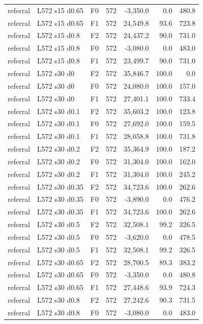 \begin{longtable}{p{1.8cm}p{3.35cm}lrrrr}
referral & L572 s15 d0.65 & F0 & 572 & -3,350.0 & 0.0 & 480.8\\
referral & L572 s15 d0.65 & F1 & 572 & 24,549.8 & 93.6 & 723.8\\
referral & L572 s15 d0.8 & F2 & 572 & 24,437.2 & 90.0 & 731.0\\
referral & L572 s15 d0.8 & F0 & 572 & -3,080.0 & 0.0 & 483.0\\
referral & L572 s15 d0.8 & F1 & 572 & 23,499.7 & 90.0 & 731.0\\
referral & L572 s30 d0 & F2 & 572 & 35,846.7 & 100.0 & 0.0\\
referral & L572 s30 d0 & F0 & 572 & 24,080.0 & 100.0 & 157.0\\
referral & L572 s30 d0 & F1 & 572 & 27,401.1 & 100.0 & 733.4\\
referral & L572 s30 d0.1 & F2 & 572 & 35,603.2 & 100.0 & 123.8\\
referral & L572 s30 d0.1 & F0 & 572 & 27,692.0 & 100.0 & 159.5\\
referral & L572 s30 d0.1 & F1 & 572 & 28,058.8 & 100.0 & 731.8\\
referral & L572 s30 d0.2 & F2 & 572 & 35,364.9 & 100.0 & 187.2\\
referral & L572 s30 d0.2 & F0 & 572 & 31,304.0 & 100.0 & 162.0\\
referral & L572 s30 d0.2 & F1 & 572 & 31,304.0 & 100.0 & 245.2\\
referral & L572 s30 d0.35 & F2 & 572 & 34,723.6 & 100.0 & 262.6\\
referral & L572 s30 d0.35 & F0 & 572 & -3,890.0 & 0.0 & 476.2\\
referral & L572 s30 d0.35 & F1 & 572 & 34,723.6 & 100.0 & 262.6\\
referral & L572 s30 d0.5 & F2 & 572 & 32,508.1 & 99.2 & 326.5\\
referral & L572 s30 d0.5 & F0 & 572 & -3,620.0 & 0.0 & 478.5\\
referral & L572 s30 d0.5 & F1 & 572 & 32,508.1 & 99.2 & 326.5\\
referral & L572 s30 d0.65 & F2 & 572 & 28,700.5 & 89.3 & 383.2\\
referral & L572 s30 d0.65 & F0 & 572 & -3,350.0 & 0.0 & 480.8\\
referral & L572 s30 d0.65 & F1 & 572 & 27,448.6 & 93.9 & 724.3\\
referral & L572 s30 d0.8 & F2 & 572 & 27,242.6 & 90.3 & 731.5\\
referral & L572 s30 d0.8 & F0 & 572 & -3,080.0 & 0.0 & 483.0\\

\end{longtable}
